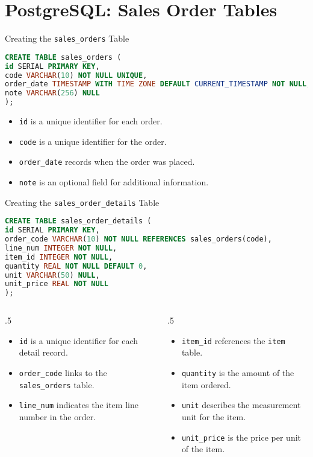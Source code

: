 \documentclass[aspectratio=169, table]{beamer}
\begin{document}
\section{PostgreSQL: Sales Order Tables}
\begin{frame}[fragile]{Creating the \texttt{sales\_orders} Table}
\vspace{15pt}
\begin{lstlisting}[language=Sql]
CREATE TABLE sales_orders (
id SERIAL PRIMARY KEY,
code VARCHAR(10) NOT NULL UNIQUE,
order_date TIMESTAMP WITH TIME ZONE DEFAULT CURRENT_TIMESTAMP NOT NULL,
note VARCHAR(256) NULL
);
\end{lstlisting}

\begin{itemize}
\item \texttt{id} is a unique identifier for each order.
\item \texttt{code} is a unique identifier for the order.
\item \texttt{order\_date} records when the order was placed.
\item \texttt{note} is an optional field for additional information.
\end{itemize}
\end{frame}

\begin{frame}[fragile]{Creating the \texttt{sales\_order\_details} Table}
\vspace{15pt}
\begin{lstlisting}[language=Sql]
CREATE TABLE sales_order_details (
id SERIAL PRIMARY KEY,
order_code VARCHAR(10) NOT NULL REFERENCES sales_orders(code),
line_num INTEGER NOT NULL,
item_id INTEGER NOT NULL,
quantity REAL NOT NULL DEFAULT 0,
unit VARCHAR(50) NULL,
unit_price REAL NOT NULL
);
\end{lstlisting}
\vspace{-20pt}
\begin{columns}[t]
\begin{column}{.5\pagewidth}
\begin{itemize}
\item \texttt{id} is a unique identifier for each detail record.
\item \texttt{order\_code} links to the \texttt{sales\_orders} table.
\item \texttt{line\_num} indicates the item line number in the order.
\end{itemize}
\end{column}
\begin{column}{.5\pagewidth}
\begin{itemize}
\item \texttt{item\_id} references the \texttt{item} table.
\item \texttt{quantity} is the amount of the item ordered.
\item \texttt{unit} describes the measurement unit for the item.
\item \texttt{unit\_price} is the price per unit of the item.
\end{itemize}
\end{column}
\end{columns}
\end{frame}
\end{document}
